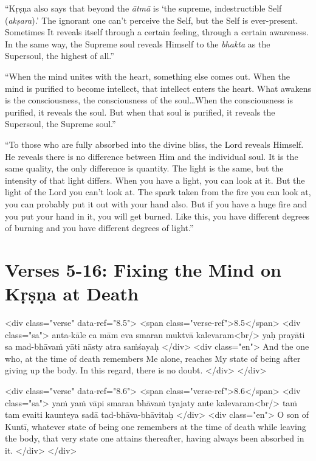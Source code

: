 \enquote{Kṛṣṇa also says that beyond the \textit{ātmā} is \enquote{the supreme, indestructible Self (\textit{akṣara}).} The ignorant one can’t perceive the Self, but the Self is ever-present. Sometimes It reveals itself through a certain feeling, through a certain awareness. In the same way, the Supreme soul reveals Himself to the \textit{bhakta} as the Supersoul, the highest of all.}

\enquote{When the mind unites with the heart, something else comes out. When the mind is purified to become intellect, that intellect enters the heart. What awakens is the consciousness, the consciousness of the soul\ldots When the consciousness is purified, it reveals the soul. But when that soul is purified, it reveals the Supersoul, the Supreme soul.}

\enquote{To those who are fully absorbed into the divine bliss, the Lord reveals Himself. He reveals there is no difference between Him and the individual soul. It is the same quality, the only difference is quantity. The light is the same, but the intensity of that light differs. When you have a light, you can look at it. But the light of the Lord you can’t look at. The spark taken from the fire you can look at, you can probably put it out with your hand also. But if you have a huge fire and you put your hand in it, you will get burned. Like this, you have different degrees of burning and you have different degrees of light.}

\section{Verses 5-16: Fixing the Mind on Kṛṣṇa at Death}\label{sec-verses-5-16-fixing-the-mind-on-krsna-at-death}


\begin{html}
<div class="verse" data-ref="8.5">
  <span class="verse-ref">8.5</span>
  <div class="sa">
    anta-kāle ca mām eva smaran muktvā kalevaram<br/>
    yaḥ prayāti sa mad-bhāvaṁ yāti nāsty atra saṁśayaḥ
  </div>
  <div class="en">
    And the one who, at the time of death remembers Me alone, reaches My state of being after giving up the body. In this regard, there is no doubt.
  </div>
</div>
\end{html}



\begin{html}
<div class="verse" data-ref="8.6">
  <span class="verse-ref">8.6</span>
  <div class="sa">
    yaṁ yaṁ vāpi smaran bhāvaṁ tyajaty ante kalevaram<br/>
    taṁ tam evaiti kaunteya sadā tad-bhāva-bhāvitaḥ
  </div>
  <div class="en">
    O son of Kuntī, whatever state of being one remembers at the time of death while leaving the body, that very state one attains thereafter, having always been absorbed in it.
  </div>
</div>
\end{html}



